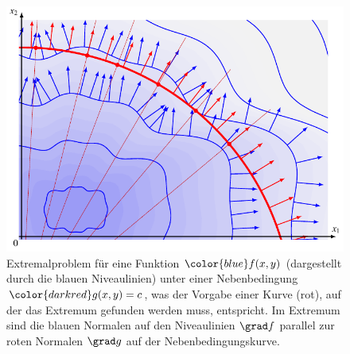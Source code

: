 %
%
%
\begin{figure}
\centering
\includegraphics{chapters/010-fuvar/images/nebenbedingung.pdf}
\caption{Extremalproblem für eine Funktion ${\color{blue}f(x,y)}$
(dargestellt durch
die {\color{blue}blauen} Niveaulinien) unter einer Nebenbedingung
${\color{darkred}g(x,y)=c}$, was der Vorgabe einer Kurve
({\color{darkred}rot}), auf der das Extremum gefunden werden muss,
entspricht.
Im Extremum sind die {\color{blue}blauen} Normalen auf den Niveaulinien
$\grad f$ parallel zur {\color{darkred}roten} Normalen $\grad g$ auf
der Nebenbedingungskurve.
\label{buch:fuvar:nebenbedingung:fig:nebenbedingung}}
\end{figure}
